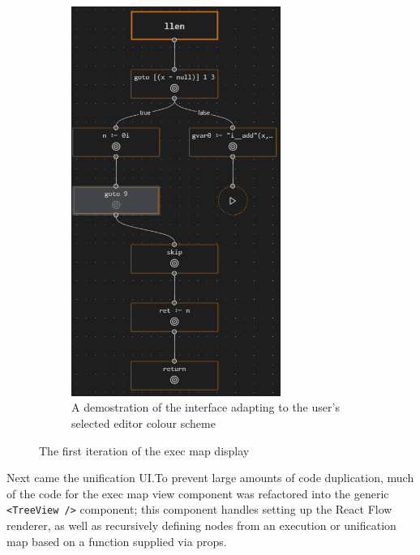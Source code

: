 \begin{figure}
\begin{subfigure}[b]{0.4\textwidth}
    \includegraphics[width=0.75\textwidth]{img/execmap-theming.png}
    \caption{
      A demostration of the interface adapting to the user's selected editor
      colour scheme}%
    \label{fig:execmap-theming}
  \end{subfigure}
  \caption{The first iteration of the exec map display}
\end{figure}

Next came the unification UI.\@ To prevent large amounts of code duplication,
much of the code for the exec map view component was refactored into the generic
\texttt{<TreeView />} component; this component handles setting up the React
Flow renderer, as well as recursively defining nodes from an execution or
unification map based on a function supplied via props.

